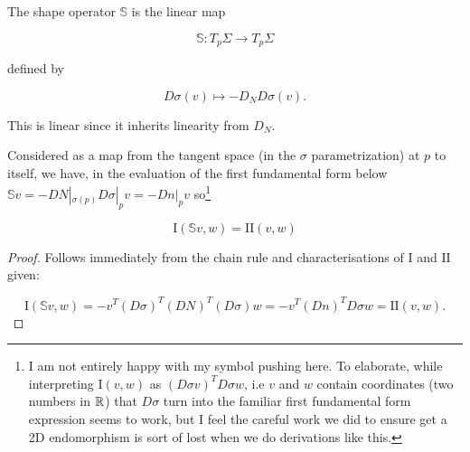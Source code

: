 \documentclass[11pt]{scrartcl}
\begin{document}
\begin{definition}

\label{shape definition}

The shape operator $\mathbb{S}$ is the linear map %

\begin{equation}
    \mathbb{S} : T_p \Sigma \rightarrow T_p \Sigma
\end{equation}

defined by

\begin{equation}
    D\sigma(v) \mapsto - D_N D\sigma(v).
\end{equation}

This is linear since it inherits linearity from $D_N$.

\end{definition}

Considered as a map from the tangent space (in the $\sigma$ parametrization) at $p$ to itself, we have, in the evaluation of the first fundamental form below $\mathbb{S}v = -DN|_{\sigma (p)} D \sigma|_p v = - Dn|_p v$ so\footnote{I am not entirely happy with my symbol pushing here. To elaborate, while interpreting $\text{I}(v,w)$ as $(D \sigma v)^T D \sigma w$, i.e $v$ and $w$ contain coordinates (two numbers in $\mathbb R$) that $D\sigma$ turn into the familiar first fundamental form expression seems to work, but I feel the careful work we did to ensure get a 2D endomorphism is sort of lost when we do derivations like this.}

\begin{theorem}

\label{shape identity}

\begin{equation}
    \text{I}(\mathbb{S}v,w) = \text{II}(v,w)
\end{equation}

\begin{proof}

Follows immediately from the chain rule and characterisations of $\text{I}$ and $\text{II}$ given:

\begin{equation}
    \text{I} (\mathbb{S}v, w) = - v^T (D \sigma)^T (DN)^T (D \sigma) w = - v^T (Dn)^T D \sigma w = \text{II}(v,w).
\end{equation}


\end{proof}
\end{theorem}
\end{document}

